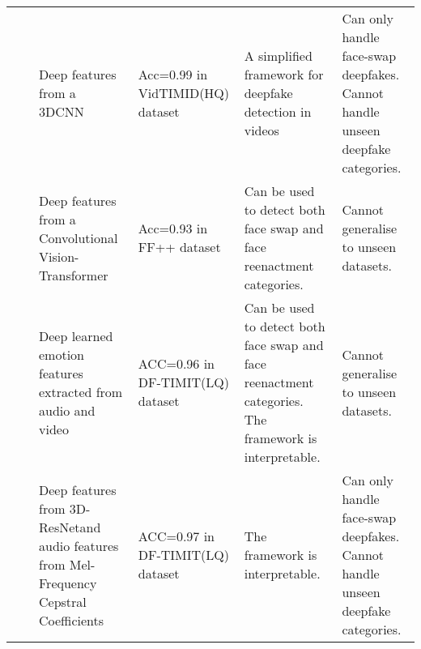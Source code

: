 \begin{table*}[htbp]
{\begin{tabular}{|p{2cm}|p{1cm}|p{5cm}|p{3cm}|p{5cm}|p{5cm}|}
                                   & \cite{nguyen2021learning}           & Deep features from a 3DCNN                                                                                             & Acc=0.99 in VidTIMID(HQ) \cite{sanderson2009multi} dataset                   & A simplified framework for deepfake detection in videos                                                                                                                                                                                     & Can only handle face-swap deepfakes. Cannot handle unseen deepfake categories.                        \\ \cline{2-6} 
                                   & \cite{wodajo2021deepfake}           & Deep features from a Convolutional Vision-Transformer                                                                  & Acc=0.93 in FF++ dataset \cite{rossler2019faceforensics++}                           & Can be used to detect both face swap and face reenactment categories.                                                                                                                                                                       & Cannot generalise to unseen datasets.                                                                 \\ \cline{2-6} 
                                   & \cite{mittal2020emotions}           & Deep learned emotion features extracted from audio and video                                                           & ACC=0.96 in DF-TIMIT(LQ) dataset \cite{korshunov2018deepfakes}                   & Can be used to detect both face swap and face reenactment categories. The framework is interpretable.                                                                                                                                       & Cannot generalise to unseen datasets.                                                                 \\ \cline{2-6} 
                                   & \cite{chugh2020not}                 & Deep features from 3D- ResNetand audio features from Mel-Frequency Cepstral Coefficients                               & ACC=0.97 in DF-TIMIT(LQ) dataset \cite{korshunov2018deepfakes}                   & The framework is interpretable.                                                                                                                                                                                                             & Can only handle face-swap deepfakes. Cannot handle unseen deepfake categories.                        \\ \cline{2-6} 

\end{tabular}}
\end{table*}

